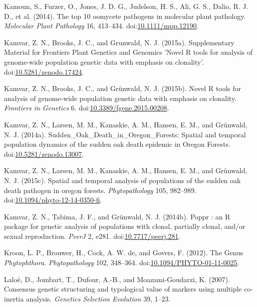 \documentclass[double,12pt]{beavtex}
\begin{document}
  \hypertarget{ref-kamoun2014top}{}
  Kamoun, S., Furzer, O., Jones, J. D. G., Judelson, H. S., Ali, G. S.,
  Dalio, R. J. D., et al. (2014). The top 10 oomycete pathogens in
  molecular plant pathology. \emph{Molecular Plant Pathology} 16,
  413--434.
  doi:\href{https://doi.org/10.1111/mpp.12190}{10.1111/mpp.12190}.
  
  \hypertarget{ref-kamvar2015poppr2supp}{}
  Kamvar, Z. N., Brooks, J. C., and Grunwald, N. J. (2015a). Supplementary
  Material for Frontiers Plant Genetics and Genomics 'Novel R tools for
  analysis of genome-wide population genetic data with emphasis on
  clonality'.
  doi:\href{https://doi.org/10.5281/zenodo.17424}{10.5281/zenodo.17424}.
  
  \hypertarget{ref-kamvar2015novel}{}
  Kamvar, Z. N., Brooks, J. C., and Grünwald, N. J. (2015b). Novel R tools
  for analysis of genome-wide population genetic data with emphasis on
  clonality. \emph{Frontiers in Genetics} 6.
  doi:\href{https://doi.org/10.3389/fgene.2015.00208}{10.3389/fgene.2015.00208}.
  
  \hypertarget{ref-kamvar2014sudden}{}
  Kamvar, Z. N., Larsen, M. M., Kanaskie, A. M., Hansen, E. M., and
  Grünwald, N. J. (2014a). Sudden\_Oak\_Death\_in\_Oregon\_Forests:
  Spatial and temporal population dynamics of the sudden oak death
  epidemic in Oregon Forests.
  doi:\href{https://doi.org/10.5281/zenodo.13007}{10.5281/zenodo.13007}.
  
  \hypertarget{ref-kamvar2015spatial}{}
  Kamvar, Z. N., Larsen, M. M., Kanaskie, A. M., Hansen, E. M., and
  Grünwald, N. J. (2015c). Spatial and temporal analysis of populations of
  the sudden oak death pathogen in oregon forests. \emph{Phytopathology}
  105, 982--989.
  doi:\href{https://doi.org/10.1094/phyto-12-14-0350-fi}{10.1094/phyto-12-14-0350-fi}.
  
  \hypertarget{ref-kamvar2014poppr}{}
  Kamvar, Z. N., Tabima, J. F., and Grünwald, N. J. (2014b). Poppr : an R
  package for genetic analysis of populations with clonal, partially
  clonal, and/or sexual reproduction. \emph{PeerJ} 2, e281.
  doi:\href{https://doi.org/10.7717/peerj.281}{10.7717/peerj.281}.
  
  \hypertarget{ref-kroon2012genus}{}
  Kroon, L. P., Brouwer, H., Cock, A. W. de, and Govers, F. (2012). The
  Genus \emph{Phytophthora}. \emph{Phytopathology} 102, 348--364.
  doi:\href{https://doi.org/10.1094/PHYTO-01-11-0025}{10.1094/PHYTO-01-11-0025}.
  
  \hypertarget{ref-laloe2007consensus}{}
  Laloë, D., Jombart, T., Dufour, A.-B., and Moazami-Goudarzi, K. (2007).
  Consensus genetic structuring and typological value of markers using
  multiple co-inertia analysis. \emph{Genetics Selection Evolution} 39,
  1--23.
  
\end{document}

